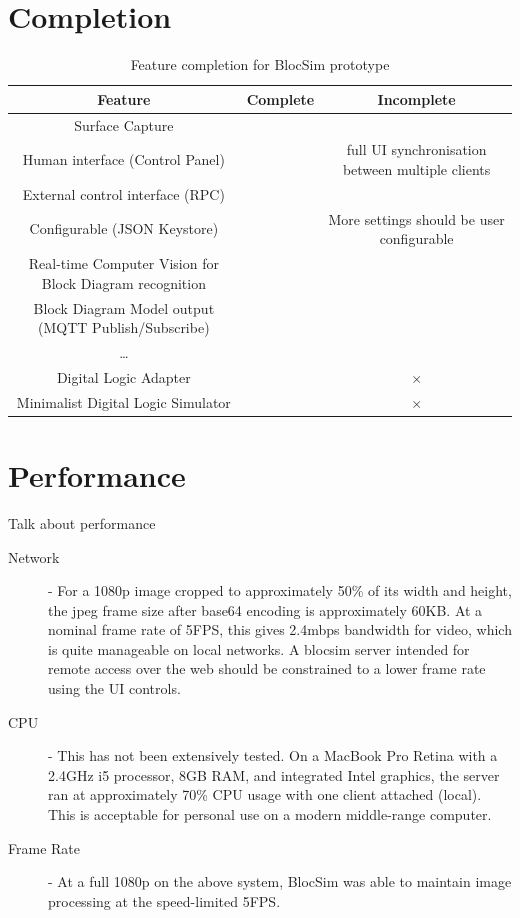 \documentclass[titlesmallcaps, examinerscopy, copyrightpage]{uqthesis}
\newcommand{\tick}{\checkmark}
\newcommand{\gtick}{\color{ForestGreen} \tick }
\newcommand{\cross}{$\times$ }
\newcommand{\rcross}{\color{red} \cross }
\begin{document}
\section{Completion}



\begin{table}[ht!]
	\center
	\begin{tabular}{c|c|c}
		\hline
		Feature & Complete & Incomplete \\
		\hline
		Surface Capture & \gtick & \\
		Human interface (Control Panel) & \gtick & full UI synchronisation between multiple clients \\
		External control interface (RPC) & \gtick & \\
		Configurable (JSON Keystore) & \gtick & More settings should be user configurable \\
		Real-time Computer Vision for \newline Block Diagram recognition & \gtick & \\
		Block Diagram Model output \newline (MQTT Publish/Subscribe) & \gtick & \\
		\ldots & & \\
		Digital Logic Adapter & & \rcross \\
		Minimalist Digital Logic Simulator & & \rcross \\
		\hline
	\end{tabular}
	\caption{Feature completion for BlocSim prototype}
	\label{tab:completion}
\end{table} 

\newpage

\section{Performance}

Talk about performance

\begin{description}
	\item[Network] - For a 1080p image cropped to approximately 50\% of its width and height, the jpeg frame size after base64 encoding is approximately 60KB. At a nominal frame rate of 5FPS, this gives 2.4mbps bandwidth for video, which is quite manageable on local networks. A blocsim server intended for remote access over the web should be constrained to a lower frame rate using the UI controls.
	\item[CPU] - This has not been extensively tested. On a MacBook Pro Retina with a 2.4GHz i5 processor, 8GB RAM, and integrated Intel graphics, the server ran at approximately 70\% CPU usage with one client attached (local). This is acceptable for personal use on a modern middle-range computer. 
	\item[Frame Rate] - At a full 1080p on the above system, BlocSim was able to maintain image processing at the speed-limited 5FPS.
\end{description}
\end{document}
